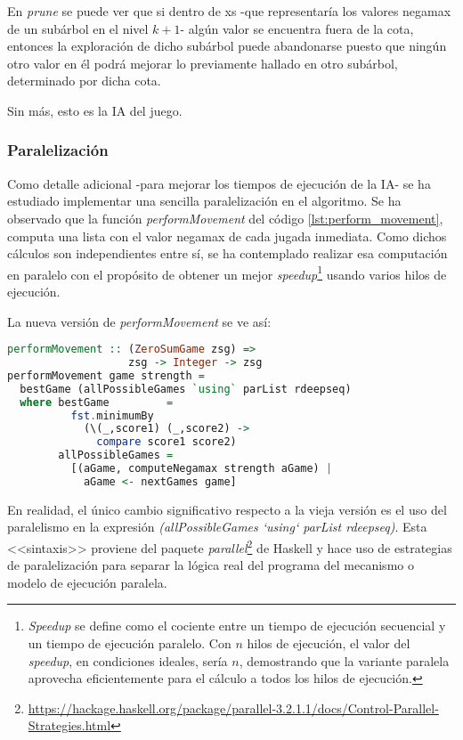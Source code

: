 \documentclass{llncs}
\begin{document}
En \textit{prune} se puede ver que si dentro de xs -que representaría los valores negamax de un subárbol en el nivel $k+1$- algún valor se encuentra fuera de la cota, entonces la exploración de dicho subárbol puede abandonarse puesto que ningún otro valor en él podrá mejorar lo previamente hallado en otro subárbol, determinado por dicha cota.

Sin más, esto es la IA del juego.

\subsubsection{ Paralelización }

Como detalle adicional -para mejorar los tiempos de ejecución de la IA- se ha estudiado implementar una sencilla paralelización en el algoritmo. Se ha observado que la función \textit{performMovement} del código \ref{lst:perform_movement}, computa una lista con el valor negamax de cada jugada inmediata. Como dichos cálculos son independientes entre sí, se ha contemplado realizar esa computación en paralelo con el propósito de obtener un mejor \textit{speedup}\footnote{\textit{Speedup} se define como el cociente entre un tiempo de ejecución secuencial y un tiempo de ejecución paralelo. Con $n$ hilos de ejecución, el valor del \textit{speedup}, en condiciones ideales, sería $n$, demostrando que la variante paralela aprovecha eficientemente para el cálculo a todos los hilos de ejecución.} usando varios hilos de ejecución.

La nueva versión de \textit{performMovement} se ve así:

\begin{lstlisting}[frame=single, language=haskell, captionpos=b, caption=Definición paralela de performMovement]
performMovement :: (ZeroSumGame zsg) =>
                   zsg -> Integer -> zsg
performMovement game strength =
  bestGame (allPossibleGames `using` parList rdeepseq)
  where bestGame         =
          fst.minimumBy
            (\(_,score1) (_,score2) ->
              compare score1 score2)
        allPossibleGames =
          [(aGame, computeNegamax strength aGame) |
            aGame <- nextGames game]
\end{lstlisting}

En realidad, el único cambio significativo respecto a la vieja versión es el uso del paralelismo en la expresión \textit{(allPossibleGames `using` parList rdeepseq)}. Esta <<sintaxis>> proviene del paquete \textit{parallel}\footnote{\url{https://hackage.haskell.org/package/parallel-3.2.1.1/docs/Control-Parallel-Strategies.html}} de Haskell y hace uso de estrategias de paralelización para separar la lógica real del programa del mecanismo o modelo de ejecución paralela.
\end{document}
